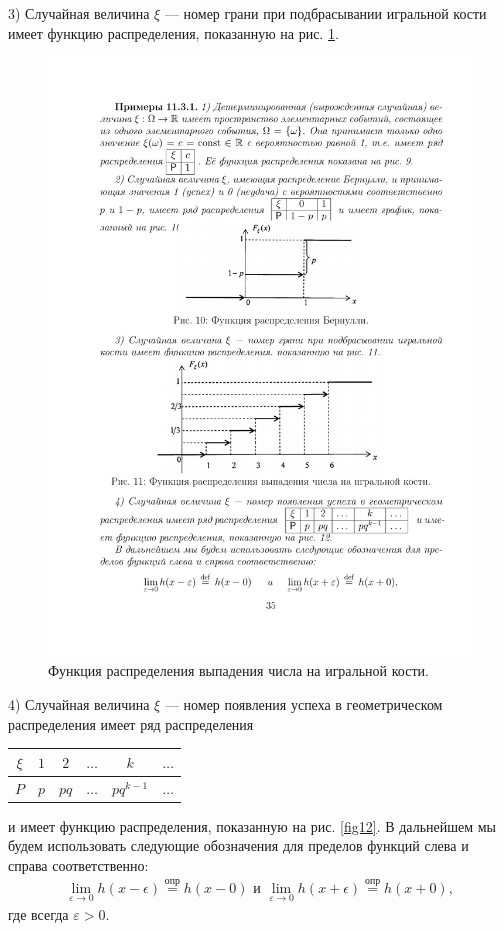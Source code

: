 3) Случайная величина $\xi$ — номер грани при подбрасывании игральной
кости имеет функцию распределения, показанную на рис. \ref{fig11}.
\begin{figure}[H]
	\centering
	\includegraphics[]{pic/pic11}
	\caption{Функция распределения выпадения числа на игральной кости.}
	\label{fig11}
\end{figure}

4) Случайная величина $\xi$ — номер появления успеха в геометрическом
распределения имеет ряд распределения 
\begin{tabular}{|c|c|c|c|c|c|}
\hline
$\xi$ & $1$ & $2$ & $\dots$ & $k$ & $\dots$\\ \hline
$P$ & $p$ & $pq$ & $\dots$ & $pq^{k-1}$ & $\dots$\\ \hline
\end{tabular}
и имеет функцию распределения, показанную на рис. \ref{fig12}.
В дальнейшем мы будем использовать следующие обозначения для пределов функций слева и справа соответственно:
\begin{gather*}
	\lim_{\varepsilon\to 0}h(x-\epsilon)\stackrel{\text{опр}}{=}h(x-0) \,\, \text{и} \,\,
	\lim_{\varepsilon\to 0}h(x+\epsilon)\stackrel{\text{опр}}{=}h(x+0),
\end{gather*}
где всегда $\varepsilon >0$.

